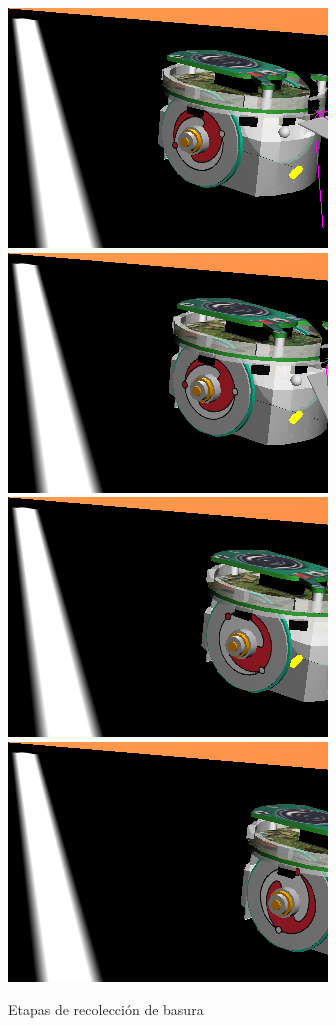 \begin{figure}[htp]
\begin{center}
\includegraphics[scale=0.25]{comportamientos/collect5.png}
\includegraphics[scale=0.25]{comportamientos/collect6.png}
\includegraphics[scale=0.25]{comportamientos/collect7.png}
\includegraphics[scale=0.25]{comportamientos/collect8.png}
\caption{Etapas de recolecci\'on de basura}
\label{fig:recollection}
\end{center}
\end{figure}



